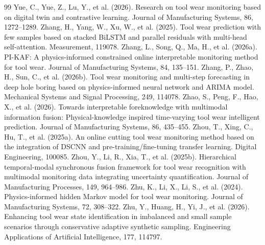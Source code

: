 \documentclass[a4paper,fleqn]{cas-sc}
\begin{document}
\begin{thebibliography}{99}
     Yue, C., Yue, Z., Lu, Y., et al. (2026). Research on tool wear monitoring based on digital twin and contrastive learning. Journal of Manufacturing Systems, 86, 1272--1289.
     Zhang, H., Yang, W., Xu, W., et al. (2025). Tool wear prediction with few samples based on stacked BiLSTM and parallel residuals with multi-head self-attention. Measurement, 119078.
     Zhang, L., Song, Q., Ma, H., et al. (2026a). PI-KAF: A physics-informed constrained online interpretable monitoring method for tool wear. Journal of Manufacturing Systems, 84, 135--151.
     Zhang, P., Zhao, H., Sun, C., et al. (2026b). Tool wear monitoring and multi-step forecasting in deep hole boring based on physics-informed neural network and ARIMA model. Mechanical Systems and Signal Processing, 249, 114078.
     Zhao, S., Peng, F., Hao, X., et al. (2026). Towards interpretable foreknowledge with multimodal information fusion: Physical-knowledge inspired time-varying tool wear intelligent prediction. Journal of Manufacturing Systems, 86, 435--455.
     Zhou, T., Xing, C., Hu, T., et al. (2025a). An online cutting tool wear monitoring method based on the integration of DSCNN and pre-training/fine-tuning transfer learning. Digital Engineering, 100085.
     Zhou, Y., Li, R., Xia, T., et al. (2025b). Hierarchical temporal-modal synchronous fusion framework for tool wear recognition with multimodal monitoring data integrating uncertainty quantification. Journal of Manufacturing Processes, 149, 964--986.
     Zhu, K., Li, X., Li, S., et al. (2024). Physics-informed hidden Markov model for tool wear monitoring. Journal of Manufacturing Systems, 72, 308--322.
     Zhu, Y., Huang, H., Yi, J., et al. (2026). Enhancing tool wear state identification in imbalanced and small sample scenarios through conservative adaptive synthetic sampling. Engineering Applications of Artificial Intelligence, 177, 114797.
  \end{thebibliography}
  
\end{document}

